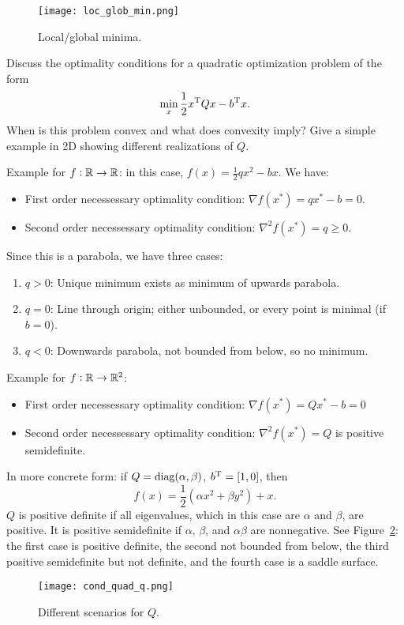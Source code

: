 \documentclass{article}
\begin{document}
\begin{figure}[H]
  \centering
  \texttt{[image: loc\_glob\_min.png]}
  \caption{Local/global minima.\label{fig:min}}
\end{figure}

\begin{question}
  Discuss the optimality conditions for a quadratic optimization problem of the form
  \begin{equation*}
    \min_x \frac{1}{2} x^{\mathrm{T}} Q x - b^{\mathrm{T}} x.
  \end{equation*}
  When is this problem convex and what does convexity imply? Give a simple example in 2D showing
  different realizations of \(Q\).
\end{question}

Example for \(f: \mathbb{R} \to \mathbb{R}\): in this case, \(f(x) = \frac{1}{2}qx^2 - bx\). We have:
\begin{itemize}
\item First order necessessary optimality condition: \(\nabla f(x^*) = qx^* - b = 0\).
\item Second order necessessary optimality condition: \(\nabla^2 f(x^*) = q \geq 0\).
\end{itemize}
Since this is a parabola, we have three cases:
\begin{enumerate}
\item \(q > 0\): Unique minimum exists as minimum of upwards parabola.
\item \(q = 0\): Line through origin; either unbounded, or every point is minimal (if \(b = 0\)).
\item \(q < 0\): Downwards parabola, not bounded from below, so no minimum.
\end{enumerate}

Example for \(f: \mathbb{R} \to \mathbb{R}^2\):
\begin{itemize}
\item First order necessessary optimality condition: \(\nabla f(x^*) = Qx^* - b = 0\)
\item Second order necessessary optimality condition: \(\nabla^2 f(x^*) = Q\) is positive
  semidefinite.	
\end{itemize}
In more concrete form: if \(Q = \operatorname{diag}(\alpha, \beta)\), \(b^{\mathrm{T}} = [1, 0]\), then
\begin{equation*}
  f(x) = \frac{1}{2} (\alpha x^2 + \beta y^2) + x.
\end{equation*}
\(Q\) is positive definite if all eigenvalues, which in this case are \(\alpha\) and \(\beta\), are
positive.  It is positive semidefinite if \(\alpha\), \(\beta\), and \(\alpha\beta\) are
nonnegative.  See Figure~\ref{fig:cond_quad}: the first case is positive definite, the second not
bounded from below, the third positive semidefinite but not definite, and the fourth case is a
saddle surface.
\begin{figure}[H]
  \centering
  \texttt{[image: cond\_quad\_q.png]}
  \caption{Different scenarios for \(Q\).\label{fig:cond_quad}}
\end{figure}
\end{document}
